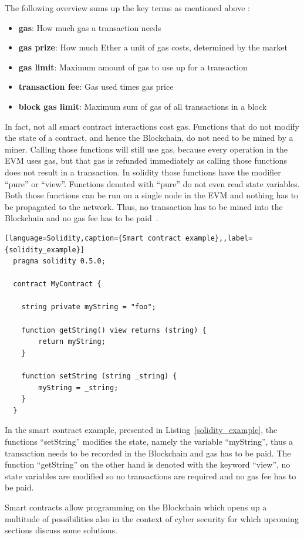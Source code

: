 The following overview sums up the key terms as mentioned above \cite{blockgeeks}:
\begin{itemize}
  \item {\textbf{gas}: How much gas a transaction needs }
  \item {\textbf{gas prize}: How much Ether a unit of gas costs, determined by the market}
  \item {\textbf{gas limit}: Maximum amount of gas to use up for a transaction}
  \item {\textbf{transaction fee}: Gas used times gas price}
  \item {\textbf{block gas limit}: Maximum sum of gas of all transactions in a block}

\end{itemize}

In fact, not all smart contract interactions cost gas. Functions that do not modify the state of a contract, and hence the Blockchain, do not need to be mined by a miner.
Calling those functions will still use gas, because every operation in the EVM uses gas, but that gas is refunded immediately as calling those functions does not result in a transaction.
In solidity those functions have the modifier ``pure'' or ``view''. Functions denoted with ``pure'' do not even read state variables. Both those functions can be run on a single node in the EVM and
nothing has to be propagated to the network. Thus, no transaction has to be mined into the Blockchain and no gas fee has to be paid~\cite{blockgeeks}.

\begin{lstlisting}[language=Solidity,caption={Smart contract example},,label={solidity_example}]
  pragma solidity 0.5.0;

  contract MyContract {

    string private myString = "foo";

    function getString() view returns (string) {
        return myString;
    }

    function setString (string _string) {
        myString = _string;
    }
  }
  \end{lstlisting}

In the smart contract example, presented in Listing~\ref{solidity_example}, the functions ``setString'' modifies the state, namely the variable ``myString'', thus a transaction needs to be recorded in the Blockchain and gas has to be paid.
The function ``getString'' on the other hand is denoted with the keyword ``view'', no state variables are modified so no transactions are required and no gas fee has to be paid.

Smart contracts allow programming on the Blockchain which opens up a multitude of possibilities also in the context of cyber security for which upcoming sections discuss some solutions.
